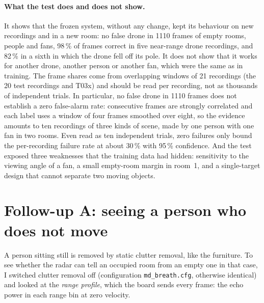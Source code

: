 \documentclass[11pt,a4paper]{article}
\begin{document}
\paragraph{What the test does and does not show.} It shows that the frozen system, without any change, kept its behaviour on new recordings and in a new room: no false drone in 1110 frames of empty rooms, people and fans, 98\,\% of frames correct in five near-range drone recordings, and 82\,\% in a sixth in which the drone fell off its pole. It does not show that it works for another drone, another person or another fan, which were the same as in training. The frame shares come from overlapping windows of 21 recordings (the 20 test recordings and T03x) and should be read per recording, not as thousands of independent trials. In particular, no false drone in 1110 frames does not establish a zero false-alarm rate: consecutive frames are strongly correlated and each label uses a window of four frames smoothed over eight, so the evidence amounts to ten recordings of three kinds of scene, made by one person with one fan in two rooms. Even read as ten independent trials, zero failures only bound the per-recording failure rate at about 30\,\% with 95\,\% confidence. And the test exposed three weaknesses that the training data had hidden: sensitivity to the viewing angle of a fan, a small empty-room margin in room~1, and a single-target design that cannot separate two moving objects.

\section{Follow-up A: seeing a person who does not move}\label{sec:still}

A person sitting still is removed by static clutter removal, like the furniture. To see whether the radar can tell an occupied room from an empty one in that case, I switched clutter removal off (configuration \texttt{md\_breath.cfg}, otherwise identical) and looked at the \emph{range profile}, which the board sends every frame: the echo power in each range bin at zero velocity.
\end{document}
